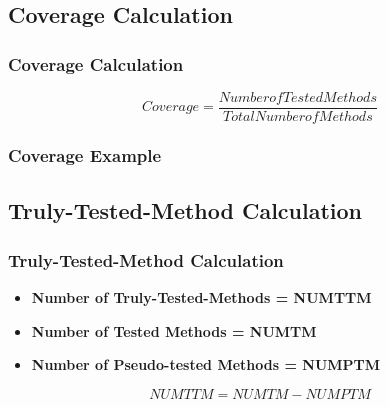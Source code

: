 \subsection{Coverage Calculation}
\begin{frame}
\frametitle{Coverage Calculation}
\begin{center}
  \begin{equation*}
    Coverage = \frac{Number of Tested Methods}{Total Number of Methods}
  \end{equation*}
\end{center}
\end{frame}

\begin{frame}
  \frametitle{Coverage Example}
  \begin{center}

  \begin{table}[htbp]

  \end{table}

  \end{center}
\end{frame}

\subsection{Truly-Tested-Method Calculation}
\begin{frame}
  \frametitle{Truly-Tested-Method Calculation}
  \begin{itemize}
    \item \textbf{Number of Truly-Tested-Methods = NUMTTM}

    \item \textbf{Number of Tested Methods = NUMTM}

    \item \textbf{Number of Pseudo-tested Methods = NUMPTM}
  \end{itemize}

  \begin{center}
    \begin{equation*}
      NUMTTM = NUMTM - NUMPTM
    \end{equation*}
  \end{center}
\end{frame}

